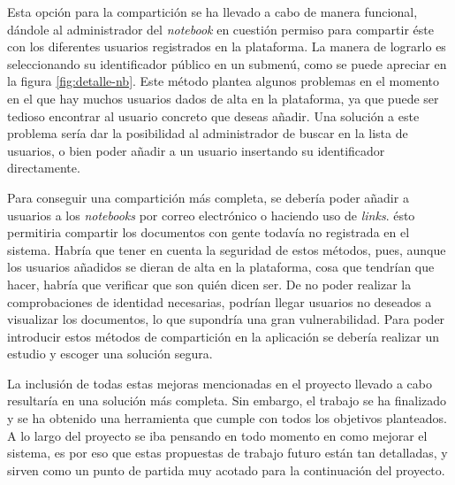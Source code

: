 \documentclass[11pt,spanish,listoffigures]{tfgetsinf}
\begin{document}
Esta opción para la compartición se ha llevado a cabo de manera funcional, dándole al administrador del \textit{notebook} en cuestión permiso para compartir éste con los diferentes usuarios registrados en la plataforma. La manera de lograrlo es seleccionando su identificador público en un submenú, como se puede apreciar en la figura \ref{fig:detalle-nb}. Este método plantea algunos problemas en el momento en el que hay muchos usuarios dados de alta en la plataforma, ya que puede ser tedioso encontrar al usuario concreto que deseas añadir. Una solución a este problema sería dar la posibilidad al administrador de buscar en la lista de usuarios, o bien poder añadir a un usuario insertando su identificador directamente. 

Para conseguir una compartición más completa, se debería poder añadir a usuarios a los \textit{notebooks} por correo electrónico o haciendo uso de \textit{links}. ésto permitiria compartir los documentos con gente todavía no registrada en el sistema. Habría que tener en cuenta la seguridad de estos métodos, pues, aunque los usuarios añadidos se dieran de alta en la plataforma, cosa que tendrían que hacer, habría que verificar que son quién dicen ser. De no poder realizar la comprobaciones de identidad necesarias, podrían llegar usuarios no deseados a visualizar los documentos, lo que supondría una gran vulnerabilidad. Para poder introducir estos métodos de compartición en la aplicación se debería realizar un estudio y escoger una solución segura.

La inclusión de todas estas mejoras mencionadas en el proyecto llevado a cabo resultaría en una solución más completa. Sin embargo, el trabajo se ha finalizado y se ha obtenido una herramienta que cumple con todos los objetivos planteados. A lo largo del proyecto se iba pensando en todo momento en como mejorar el sistema, es por eso que estas propuestas de trabajo futuro están tan detalladas, y sirven como un punto de partida muy acotado para la continuación del proyecto.



\printglossary[title=Glosario]



\end{document}
